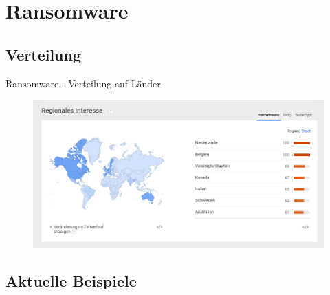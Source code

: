 \documentclass[10pt]{beamer}
\begin{document}

\section{Ransomware}
\subsection{Verteilung}
\begin{frame}{Ransomware - Verteilung auf Länder}
	\begin{figure}[p]
		\centering
		\includegraphics[scale=0.37]{ransomware_laenderverteilung.png}
	\end{figure}
\end{frame}



\subsection{Aktuelle Beispiele}
\end{document}
